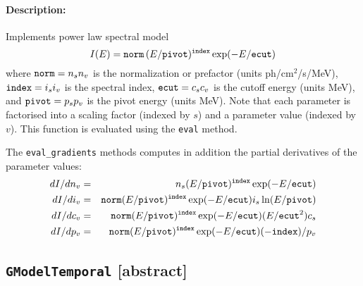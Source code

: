 \documentclass{article}[12pt,a4]
\begin{document}
\paragraph{Description:}
Implements power law spectral model
\begin{equation}
I(E) = {\tt norm} \, (E/{\tt pivot})^{{\tt index}} \exp(-E/{\tt ecut})
\end{equation}
where
${\tt norm}=n_s n_v$ is the normalization or prefactor (units ph/cm$^2$/s/MeV),
${\tt index}=i_s i_v$ is the spectral index,
${\tt ecut}=c_s c_v$ is the cutoff energy (units MeV), and
${\tt pivot}=p_s p_v$ is the pivot energy (units MeV).
Note that each parameter is factorised into a scaling factor (indexed by $s$) and a 
parameter value (indexed by $v$).
This function is evaluated using the {\tt eval} method.

The {\tt eval\_gradients} methods computes in addition the partial derivatives of 
the parameter values:
\begin{eqnarray}
dI/dn_v &= & n_s (E/{\tt pivot})^{{\tt index}}  \exp(-E/{\tt ecut}) \\
dI/di_v & = & {\tt norm} (E/{\tt pivot})^{{\tt index}}  \exp(-E/{\tt ecut}) i_s \ln(E/{\tt pivot}) \\
dI/dc_v & = & {\tt norm} (E/{\tt pivot})^{{\tt index}} \exp(-E/{\tt ecut}) (E/{\tt ecut}^2) c_s \\
dI/dp_v & = & {\tt norm} (E/{\tt pivot})^{{\tt index}}  \exp(-E/{\tt ecut}) (-{\tt index}) / p_v
\end{eqnarray}


\newpage
\subsection{{\tt GModelTemporal} \small[abstract]}
\end{document}
